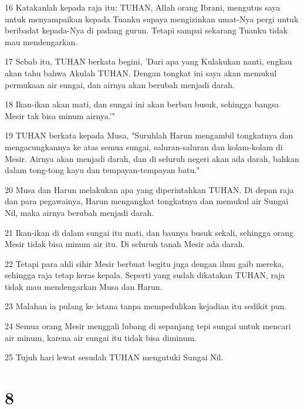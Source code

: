 \par 16 Katakanlah kepada raja itu: TUHAN, Allah orang Ibrani, mengutus saya untuk menyampaikan kepada Tuanku supaya mengizinkan umat-Nya pergi untuk beribadat kepada-Nya di padang gurun. Tetapi sampai sekarang Tuanku tidak mau mendengarkan.
\par 17 Sebab itu, TUHAN berkata begini, 'Dari apa yang Kulakukan nanti, engkau akan tahu bahwa Akulah TUHAN. Dengan tongkat ini saya akan memukul permukaan air sungai, dan airnya akan berubah menjadi darah.
\par 18 Ikan-ikan akan mati, dan sungai ini akan berbau busuk, sehingga bangsa Mesir tak bisa minum airnya.'"
\par 19 TUHAN berkata kepada Musa, "Suruhlah Harun mengambil tongkatnya dan mengacungkannya ke atas semua sungai, saluran-saluran dan kolam-kolam di Mesir. Airnya akan menjadi darah, dan di seluruh negeri akan ada darah, bahkan dalam tong-tong kayu dan tempayan-tempayan batu."
\par 20 Musa dan Harun melakukan apa yang diperintahkan TUHAN. Di depan raja dan para pegawainya, Harun mengangkat tongkatnya dan memukul air Sungai Nil, maka airnya berubah menjadi darah.
\par 21 Ikan-ikan di dalam sungai itu mati, dan baunya busuk sekali, sehingga orang Mesir tidak bisa minum air itu. Di seluruh tanah Mesir ada darah.
\par 22 Tetapi para ahli sihir Mesir berbuat begitu juga dengan ilmu gaib mereka, sehingga raja tetap keras kepala. Seperti yang sudah dikatakan TUHAN, raja tidak mau mendengarkan Musa dan Harun.
\par 23 Malahan ia pulang ke istana tanpa mempedulikan kejadian itu sedikit pun.
\par 24 Semua orang Mesir menggali lubang di sepanjang tepi sungai untuk mencari air minum, karena air sungai itu tidak bisa diminum.
\par 25 Tujuh hari lewat sesudah TUHAN mengutuki Sungai Nil.

\chapter{8}

